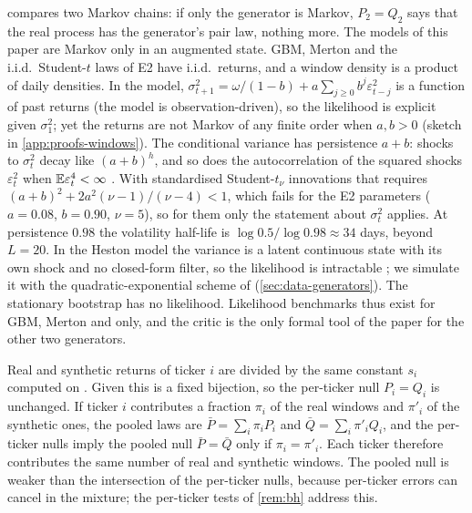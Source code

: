  compares two Markov chains: if only the generator is Markov, $P_2=Q_2$
says that the real process has the generator's pair law, nothing more. The models of this paper
are Markov only in an augmented state. GBM, Merton and the i.i.d.\ Student-$t$ laws of E2 have
i.i.d.\ returns, and a window density is a product of daily densities. In the \GARCHt{} model,
$\sigma_{t+1}^2=\omega/(1-b)+a\sum_{j\ge0}b^j\varepsilon_{t-j}^2$ is a function of past returns
(the model is observation-driven), so the likelihood is explicit given $\sigma_1^2$; yet the
returns are not Markov of any finite order when $a,b>0$ (sketch in \cref{app:proofs-windows}).
The conditional variance has persistence $a+b$: shocks to $\sigma_t^2$ decay like $(a+b)^h$, and
so does the autocorrelation of the squared shocks $\varepsilon_t^2$ when $\mathbb{E}\varepsilon_t^4<\infty$
\citep{francq_2019_garch}. With
standardised Student-$t_\nu$ innovations that requires $(a+b)^2+2a^2(\nu-1)/(\nu-4)<1$, which fails
for the E2 parameters ($a=0.08$, $b=0.90$, $\nu=5$), so for them only the statement about
$\sigma_t^2$ applies. At persistence $0.98$ the volatility half-life is
$\log0.5/\log0.98\approx34$ days, beyond $L=20$.
In the Heston model the variance is a latent continuous state with its own shock and no closed-form
filter, so the likelihood is intractable \citep{aitsahalia2007maximum}; we simulate it with the
quadratic-exponential scheme of \citet{andersen_2008_simple} (\cref{sec:data-generators}). The
stationary bootstrap has no likelihood. Likelihood benchmarks thus exist for GBM, Merton and
\GARCHt{} only, and the critic is the only formal tool of the paper for the other two generators.

\begin{remark}\label{rem:pooling}
Real and synthetic returns of ticker $i$ are divided by the same constant $s_i$ computed on
\TRAIN. Given \TRAIN{} this is a fixed bijection, so the per-ticker null $P_i=Q_i$ is unchanged.
If ticker $i$ contributes a fraction $\pi_i$ of the real windows and $\pi'_i$ of the synthetic
ones, the pooled laws are $\bar P=\sum_i\pi_iP_i$ and $\bar Q=\sum_i\pi'_iQ_i$, and the per-ticker
nulls imply the pooled null $\bar P=\bar Q$ only if $\pi_i=\pi'_i$. Each ticker therefore
contributes the same number of real and synthetic windows. The pooled null is weaker than the
intersection of the per-ticker nulls, because per-ticker errors can cancel in the mixture; the
per-ticker tests of \cref{rem:bh} address this.
\end{remark}


